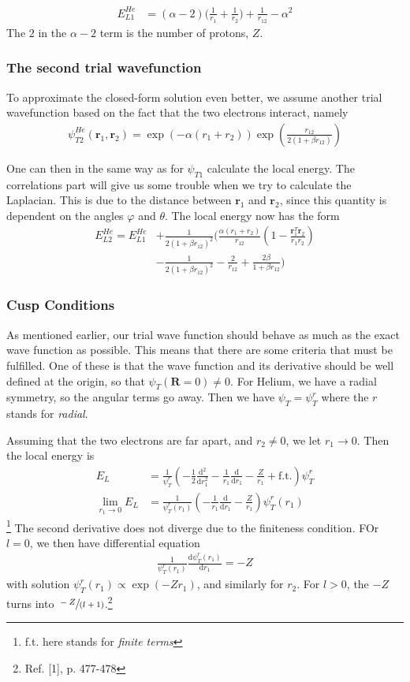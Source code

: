 \documentclass[twocolumns, a4paper,10pt,fleqn]{extarticle}
\newcommand{\eq}[1]{{\small\begin{align*}#1\end{align*}}}
\renewcommand\vec[1]{\boldsymbol{\mathbf{#1}}}
\begin{document}
\eq{
  E_{L1}^{He}
  &=(\alpha-2)\bigg( \frac{1}{r_1}+\frac{1}{r_2} \bigg)
    +\frac{1}{r_{12}}-\alpha^2
}
The $2$ in the $\alpha-2$ term is the number of protons, $Z$.

\subsubsection{The second trial wavefunction}
To approximate the closed-form solution even better,
we assume another trial wavefunction based on the fact that
the two electrons interact, namely
\eq{
  \psi_{T2}^{He} (\vec r_1,\vec r_2)
    =\exp{\left(-\alpha(r_1+r_2)\right)}
    \exp{\left(\frac{r_{12}}{2(1+\beta r_{12})}\right)}
}

One can then in the same way as for $\psi_{T1}$ calculate
the local energy. The correlations part will give us some trouble
when we try to calculate the Laplacian. This is due to
the distance between $\vec r_1$ and $\vec r_2$, since this quantity
is dependent on the angles $\varphi$ and $\theta$.
The local energy now has the form
\eq{
	E_{L2}^{He} = E_{L1}^{He}&+\frac{1}{2(1+\beta r_{12})^2}
	\bigg(\frac{\alpha(r_1+r_2)}{r_{12}}(1-
	\frac{\mathbf{r}_1^T\mathbf{r}_2}{r_1r_2})\\
	&-\frac{1}{2(1+\beta r_{12})^2}-\frac{2}{r_{12}}+
	\frac{2\beta}{1+\beta r_{12}}\bigg)
}

\subsubsection{Cusp Conditions}
As mentioned earlier, our trial wave function should behave as much
as the exact wave function as possible.
This means that there are some criteria that must be fulfilled.
One of these is that the wave function and its derivative
should be well defined at the origin,
so that $\psi_T(\vec R = 0)\neq 0$.
For Helium, we have a radial symmetry, so the angular terms go away.
Then we have $\psi_T = \psi_T^r$ where the $r$ stands for \textit{radial}.

Assuming that the two electrons are far apart, and $r_2 \neq 0$,
we let $r_1 \rightarrow 0$. Then the local energy is
\eq{E_L &=
  \frac{1}{\psi_T^{r}}\left( -\frac{1}{2}\frac{\mathrm d^2}{\mathrm d r_1^2}
  - \frac{1}{r_1}\frac{\mathrm d}{\mathrm d r_1} - \frac{Z}{r_1} + \text{f.t.}
  \right)\psi_T^{r}\\
  \lim_{r_1\rightarrow 0} E_L &=\frac{1}{\psi_T^{r}(r_1)}
  \left(- \frac{1}{r_1}\frac{\mathrm d}{\mathrm d r_1} 
  - \frac{Z}{r_1}\right)\psi_T^{r}(r_1)
}\footnote{f.t. here stands for \textit{finite terms}}
The second derivative does not diverge due to the finiteness condition.
FOr $l=0$, we then have differential equation
\eq{
  \frac{1}{\psi_T^{r}(r_1)}\frac{\mathrm d \psi_T^{r}(r_1)}{\mathrm d r_1}
  = -Z
}
with solution $\psi_T^{r}(r_1) \propto \exp(-Zr_1)$, and similarly for $r_2$.
For $l>0$, the $-Z$ turns into $\sfrac{-Z}{(l+1)}$.\footnote{Ref. [1], p. 477-478}
\end{document}
